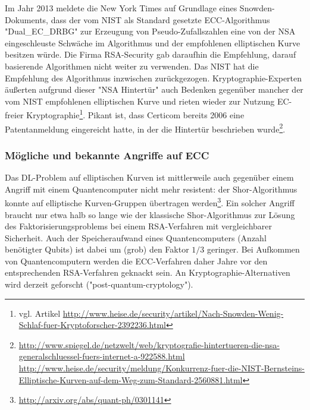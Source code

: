\begin{bem}
	Im Jahr 2013 meldete die New York Times auf Grundlage eines Snowden-Dokuments, dass der vom NIST als Standard gesetzte ECC-Algorithmus "Dual\_EC\_DRBG" zur Erzeugung von Pseudo-Zufallszahlen eine von der NSA eingeschleuste Schwäche im Algorithmus und der empfohlenen elliptischen Kurve besitzen würde.
	Die Firma RSA-Security gab daraufhin die Empfehlung, darauf basierende Algorithmen nicht weiter zu verwenden.
	Das NIST hat die Empfehlung des Algorithmus inzwischen zurückgezogen.
	Kryptographie-Experten äußerten aufgrund dieser "NSA Hintertür" auch Bedenken gegenüber mancher der vom NIST empfohlenen elliptischen Kurve und rieten wieder zur Nutzung EC-freier Kryptographie\footnote{vgl. Artikel \url{http://www.heise.de/security/artikel/Nach-Snowden-Wenig-Schlaf-fuer-Kryptoforscher-2392236.html}}. Pikant ist, dass Certicom bereits 2006 eine Patentanmeldung eingereicht hatte, in der die Hintertür beschrieben wurde\footnote{\href{http://www.spiegel.de/netzwelt/web/kryptografie-hintertueren-die-nsa-generalschluessel-fuers-internet-a-922588.html}{http://www.spiegel.de/netzwelt/web/kryptografie-hintertueren-die-nsa-generalschluessel-fuers-internet-a-922588.html} \\ \href{http://www.heise.de/security/meldung/Konkurrenz-fuer-die-NIST-Bernsteins-Elliptische-Kurven-auf-dem-Weg-zum-Standard-2560881.html}{http://www.heise.de/security/meldung/Konkurrenz-fuer-die-NIST-Bernsteins-Elliptische-Kurven-auf-dem-Weg-zum-Standard-2560881.html}}.
\end{bem}

\subsubsection{Mögliche und bekannte Angriffe auf ECC}
\label{subsub:4.4.4}
\begin{bem}
	Das DL-Problem auf elliptischen Kurven ist mittlerweile auch gegenüber einem Angriff mit einem Quantencomputer nicht mehr resistent:
	der Shor-Algorithmus konnte auf elliptische Kurven-Gruppen übertragen werden\footnote{\url{http://arxiv.org/abs/quant-ph/0301141}}.
	Ein solcher Angriff braucht nur etwa halb so lange wie der klassische Shor-Algorithmus zur Lösung des Faktorisierungsproblems bei einem RSA-Verfahren mit vergleichbarer Sicherheit.
	Auch der Speicheraufwand eines Quantencomputers (Anzahl benötigter Qubits) ist dabei um (grob) den Faktor $1/3$ geringer.
	Bei Aufkommen von Quantencomputern werden die ECC-Verfahren daher Jahre vor den entsprechenden RSA-Verfahren geknackt sein.
	An Kryptographie-Alternativen wird derzeit geforscht ("post-quantum-cryptology").
\end{bem}

